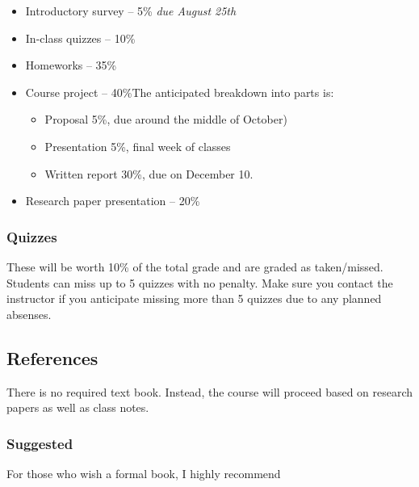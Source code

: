 \documentclass{article}
\begin{document}
\begin{itemize}%
\item Introductory survey --{} 5\% \emph{due August 25th}


\item In-class quizzes --{} 10\%


\item Homeworks --{} 35\%


\item Course project --{} 40\%\newline The anticipated breakdown into parts is:

\begin{itemize}%
\item Proposal 5\%, due around the middle of October)
\item Presentation 5\%, final week of classes
\item Written report 30\%, due on December 10.

\end{itemize}

\item Research paper presentation --{} 20\%



\end{itemize}
\hypertarget{quizzes_9}{}\subsubsection*{{Quizzes}}\label{quizzes_9}

These will be worth 10\% of the total grade and are graded as taken/missed. Students can miss up to 5 quizzes with no penalty. Make sure you contact the instructor if you anticipate missing more than 5 quizzes due to any planned absenses.

\hypertarget{references_10}{}\subsection*{{References}}\label{references_10}

There is no required text book. Instead, the course will proceed based on research papers as well as class notes.

\hypertarget{suggested_11}{}\subsubsection*{{Suggested}}\label{suggested_11}

For those who wish a formal book, I highly recommend
\end{document}
